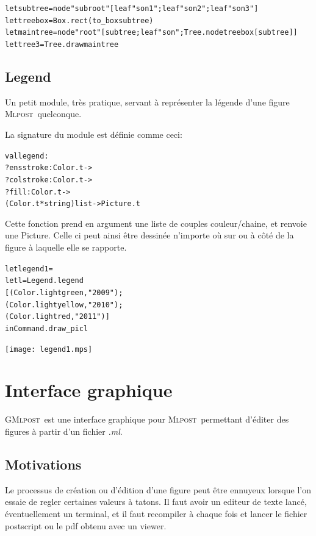 \documentclass[a4paper,12pt]{article}
\newcommand{\mlpost}{\textsc{Mlpost}}
\newcommand{\gmlpost}{\textsc{GMlpost}}
\begin{document}
\bigskip

\begin{alltt}
  let subtree = node "subroot" [leaf "son1"; leaf "son2"; leaf "son3"]
  let treebox = Box.rect (to_box subtree)
  let maintree = node "root" [subtree; leaf "son"; Tree.node treebox [subtree]]
  let tree3 = Tree.draw maintree 
\end{alltt}

\subsection{Legend}
Un petit module, très pratique, servant à représenter la légende d'une figure \mlpost\ quelconque.

La signature du module est définie comme ceci:
\begin{alltt}
  val legend : 
  ?ensstroke:Color.t ->
  ?colstroke:Color.t ->
  ?fill:Color.t ->
  (Color.t * string) list -> Picture.t
\end{alltt}

Cette fonction prend en argument une liste de couples couleur/chaine, et renvoie une Picture. Celle ci peut ainsi être dessinée n'importe où sur ou à côté de la figure à laquelle elle se rapporte.

\bigskip

\begin{minipage}{0.5\linewidth}
  \begin{alltt}
    let legend1 = 
    let l = Legend.legend
    [(Color.lightgreen,"2009");
      (Color.lightyellow,"2010");
      (Color.lightred,"2011")]
    in Command.draw_pic l
  \end{alltt}
\end{minipage}
\begin{minipage}{0.5\linewidth}
  \begin{center}
    \texttt{[image: legend1.mps]}
  \end{center}
\end{minipage}


\section{Interface graphique}
\gmlpost\ est une interface graphique pour \mlpost\ permettant d'éditer des figures à partir d'un fichier \textit{.ml}. 
\subsection{Motivations}
Le processus de création ou d'édition d'une figure peut être ennuyeux lorsque l'on essaie de regler certaines valeurs à tatons. Il faut avoir un editeur de texte lancé, éventuellement un terminal, et il faut recompiler à chaque fois et lancer le fichier postscript ou le pdf obtenu avec un viewer.
\end{document}
